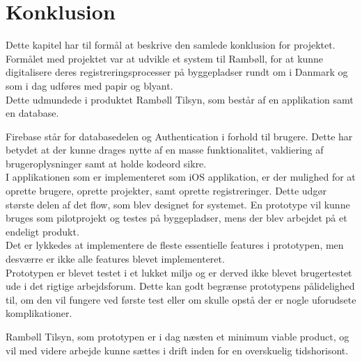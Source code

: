 \chapter{Konklusion}
Dette kapitel har til formål at beskrive den samlede 
konklusion for projektet. \\

Formålet med projektet var at udvikle et system til Rambøll, for at kunne digitalisere deres registreringsprocesser på byggepladser rundt om i Danmark og som i dag udføres med papir og blyant. \\
Dette udmundede i produktet Rambøll Tilsyn, som består af en applikation samt en database.

Firebase står for databasedelen og Authentication i forhold til brugere. Dette har betydet at der kunne drages nytte af en masse funktionalitet, valdiering af brugeroplysninger samt at holde kodeord sikre. \\
I applikationen som er implementeret som iOS applikation, er der mulighed for at oprette brugere, oprette projekter, samt oprette registreringer. Dette udgør største delen af det flow, som blev designet for systemet. En prototype vil kunne bruges som pilotprojekt og testes på byggepladser, mens der blev arbejdet på et endeligt produkt. \\
Det er lykkedes at implementere de fleste essentielle features i prototypen, men desværre er ikke alle features blevet implementeret. \\
Prototypen er blevet testet i et lukket miljø og er derved ikke blevet brugertestet ude i det rigtige arbejdsforum. Dette kan godt begrænse prototypens pålidelighed til, om den vil fungere ved første test eller om skulle opstå der er nogle uforudsete komplikationer.

Rambøll Tilsyn, som prototypen er i dag næsten et minimum viable product, og vil med videre arbejde
kunne sættes i drift inden for en overskuelig tidshorisont.


